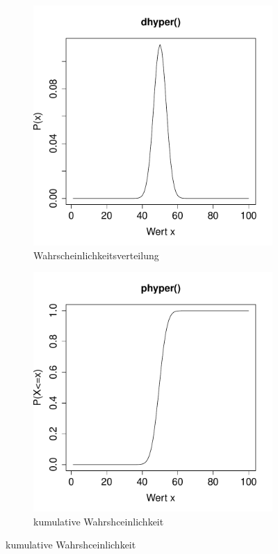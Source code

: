 \begin{figure}[h!]
\centering
\begin{subfigure}[b]{0.48\textwidth}
\includegraphics{verteilungen-005}
\caption{Wahrscheinlichkeitsverteilung}
\end{subfigure}
\begin{subfigure}[b]{0.48\textwidth}
\includegraphics{verteilungen-006}
\caption{kumulative Wahrshceinlichkeit}
\end{subfigure}


\end{figure}
